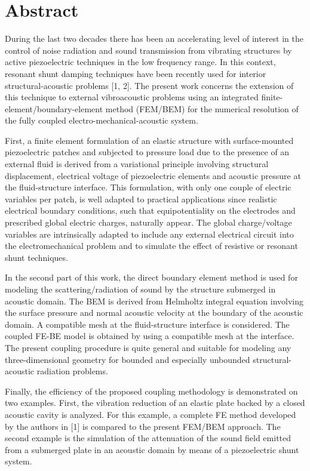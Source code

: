 \documentclass[article, A4, 11pt]{llncs}%
\begin{document}
\section*{Abstract}
During the last two decades there has been an accelerating level of interest in the control of noise radiation and sound transmission from vibrating structures by active piezoelectric techniques in the low frequency range. In this context, resonant shunt damping techniques have been recently used for interior structural-acoustic problems [1, 2]. The present work concerns the extension of this technique to external vibroacoustic problems using an integrated finite-element/boundary-element method (FEM/BEM) for the numerical resolution of the fully coupled electro-mechanical-acoustic system.  

First, a finite element formulation of an elastic structure with surface-mounted piezoelectric patches and subjected to pressure load due to the presence of an external fluid is derived from a variational principle involving structural displacement, electrical voltage of piezoelectric elements and acoustic pressure at the fluid-structure interface. This formulation, with only one couple of electric variables per patch, is well adapted to practical applications since realistic electrical boundary conditions, such that equipotentiality on the electrodes and prescribed global electric charges, naturally appear. The global charge/voltage variables are intrinsically adapted to include any external electrical circuit into the electromechanical problem and to simulate the effect of resistive or resonant shunt techniques.

In the second part of this work, the direct boundary element method is used for modeling the scattering/radiation of sound by the structure submerged in acoustic domain. The BEM is derived from Helmholtz integral equation involving the surface pressure and normal acoustic velocity at the boundary of the acoustic domain. A compatible mesh at the fluid-structure interface is considered. The coupled FE-BE model is obtained by using a compatible mesh at the interface. The present coupling procedure is quite general and suitable for modeling any three-dimensional geometry for bounded and especially unbounded structural-acoustic radiation problems.

Finally, the efficiency of the proposed coupling methodology is demonstrated on two examples. First, the vibration reduction of an elastic plate backed by a closed acoustic cavity is analyzed. For this example, a complete FE method developed by the authors in [1] is compared to the present FEM/BEM approach.  The second example is the simulation of the attenuation of the sound field emitted from a submerged plate in an acoustic domain by means of a piezoelectric shunt system. 
\end{document}
